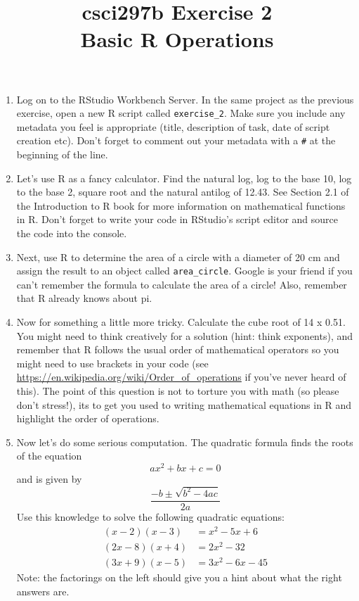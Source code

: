 \documentclass[12pt]{article}
\title{csci297b Exercise 2\\ Basic R Operations}
\date{}
\begin{document}
\maketitle

\begin{enumerate}

\item Log on to the RStudio Workbench Server. 
In the same project as the previous exercise, open a new R script called 
\verb|exercise_2|.
Make sure you include any metadata you feel is appropriate (title, description of task, date of script creation etc). Don’t forget to comment out your metadata with a \lstinline{#} at the beginning of the line.

 

\item Let’s use R as a fancy calculator. Find the natural log, log to the base 10, log to the base 2, square root and the natural antilog of 12.43. See Section 2.1 of the Introduction to R book for more information on mathematical functions in R. Don’t forget to write your code in RStudio’s script editor and source the code into the console.

 

\item Next, use R to determine the area of a circle with a diameter of 20 cm and assign the result to an object called \lstinline{area_circle}.
 Google is your friend if you can’t remember the formula to calculate the area of a circle! Also, remember that R already knows about pi.
 

\item Now for something a little more tricky. Calculate the cube root of 14 x 0.51. You might need to think creatively for a solution (hint: think exponents), and remember that R follows the usual order of mathematical operators so you might need to use brackets in your code (see 
\url{https://en.wikipedia.org/wiki/Order_of_operations} if you’ve never heard of this). The point of this question is not to torture you with math (so please don’t stress!), its to get you used to writing mathematical equations in R and highlight the order of operations.

 
 \item Now let's do some serious computation.  The quadratic formula finds the roots of the
 equation
 \[ ax^2 + bx + c = 0\]
 and is given by
 \[
 \frac{-b \pm \sqrt{b^2 - 4ac}}{2a}
 \]
 Use this knowledge to solve the following quadratic equations:
 \begin{align*}
 (x - 2)(x - 3) &= x^2 - 5 x + 6\\
 (2x - 8)(x + 4) &= 2x^2 - 32\\
 (3x + 9)(x - 5) &= 3x^2 -6x -45
 \end{align*}
 Note: the factorings on the left should give you a hint about
 what the right answers are.
 

\end{enumerate}
\end{document}
